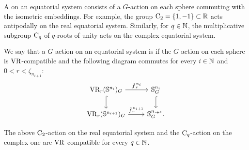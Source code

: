 \subsubsection{}
\label{subsub:system VR compatible}

A  on an equatorial system consists of a \(G\)-action on each sphere commuting with the isometric embeddings.
For example, the group \(\mathrm{C}_2 = \{1,-1\} \subset \mathbb{R}\) acts antipodally on the real equatorial system.
Similarly, for \(q \in \mathbb{N}\), the multiplicative subgroup \(\mathrm{C}_q\) of \(q\)-roots of unity acts on the complex equatorial system.

We say that a \(G\)-action on an equatorial system is  if the \(G\)-action on each sphere is \(\mathrm{VR}\)-compatible and the following diagram commutes for every \(i \in \mathbb{N}\) and $0 < r < \zeta_{n_{i+1}}$:
\begin{equation}\label{eq:VR_quotient}
    \begin{tikzcd}
	\VR_r(\bS^{n_i})_G
	\ar[d, hook]
	\ar[r, "\tilde f_{\,r}^{\,n_i}" above]
	&
	\bS^{n_i}_G
	\ar[d, hook]
	\\
	\VR_r(\bS^{n_{i+1}})_G
	\ar[r, "\tilde f_{\,r}^{\,n_{i+1}}" above]
	&
	\bS^{n_{i+1}}_G.
\end{tikzcd}
\end{equation}

\lemma The above \(\mathrm{C}_2\)-action on the real equatorial system and the \(\mathrm{C}_q\)-action on the complex one are \(\mathrm{VR}\)-compatible for every \(q \in \mathbb{N}\).


